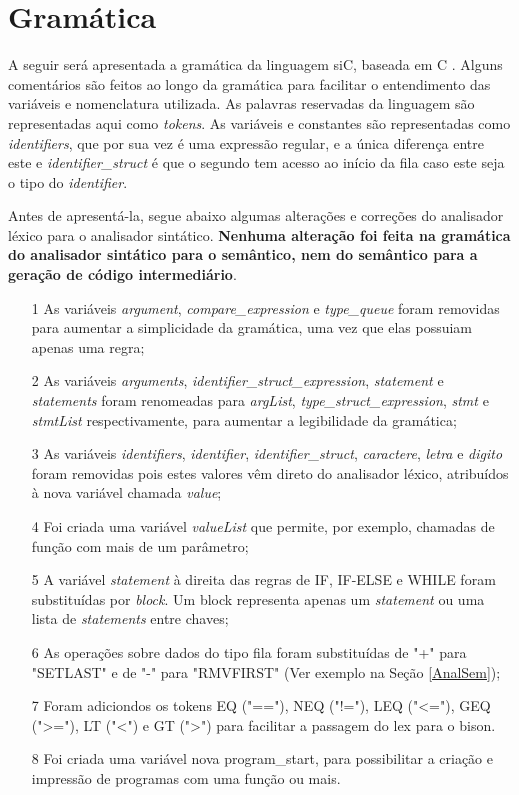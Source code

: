\documentclass[12pt]{article}
\begin{document}
\section{Gramática}

\indent A seguir será apresentada a gramática da linguagem siC, baseada em C \cite{yacc}. Alguns comentários são feitos ao longo da gramática para facilitar o entendimento das variáveis e nomenclatura utilizada. As palavras reservadas da linguagem são representadas aqui como \textit{tokens}. As variáveis e constantes são representadas como \textit{identifiers}, que por sua vez é uma expressão regular, e a única diferença entre este e \textit{identifier\_struct} é que o segundo tem acesso ao início da fila caso este seja o tipo do \textit{identifier}. 

\indent Antes de apresentá-la, segue abaixo algumas alterações e correções do analisador léxico para o analisador sintático. \textbf{Nenhuma alteração foi feita na gramática do analisador sintático para o semântico, nem do semântico para a geração de código intermediário}.

\begin{itemize}
	\item[1] As variáveis \textit{argument}, \textit{compare\_expression} e \textit{type\_queue} foram removidas para aumentar a simplicidade da gramática, uma vez que elas possuiam apenas uma regra;
	\item[2] As variáveis \textit{arguments}, \textit{identifier\_struct\_expression}, \textit{statement} e \textit{statements} foram renomeadas para \textit{argList}, \textit{type\_struct\_expression}, \textit{stmt} e \textit{stmtList} respectivamente, para aumentar a legibilidade da gramática;
	\item[3] As variáveis \textit{identifiers}, \textit{identifier}, \textit{identifier\_struct}, \textit{caractere}, \textit{letra} e \textit{digito} foram removidas pois estes valores vêm direto do analisador léxico, atribuídos à nova variável chamada \textit{value};
	\item[4] Foi criada uma variável \textit{valueList} que permite, por exemplo, chamadas de função com mais de um parâmetro;
	\item[5] A variável \textit{statement} à direita das regras de IF, IF-ELSE e WHILE foram substituídas por \textit{block}. Um block representa apenas um \textit{statement} ou uma lista de \textit{statements} entre chaves;
	\item[6] As operações sobre dados do tipo fila foram substituídas de "+" para "SETLAST" e de "-" para "RMVFIRST" (Ver exemplo na Seção \ref{AnalSem});
	\item[7] Foram adiciondos os tokens EQ ("=="), NEQ ("!="), LEQ ("<="), GEQ (">="), LT ("<") e GT (">") para facilitar a passagem do lex para o bison.
	\item[8] Foi criada uma variável nova program\_start, para possibilitar a criação e impressão de programas com uma função ou mais.
\end{itemize}
\end{document}
